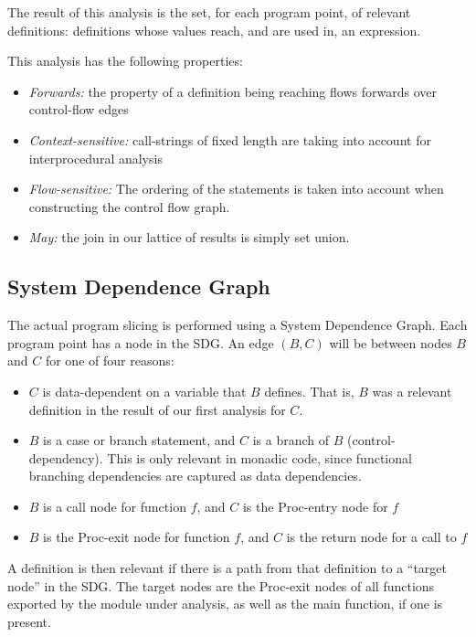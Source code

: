 \documentclass{article}
\begin{document}
The result of this analysis is the set, for each program point, of relevant definitions: definitions whose values reach, and are used in, an expression.

This analysis has the following properties:

\begin{itemize}
\item
 \textit{Forwards:} the property of a definition being reaching flows forwards over control-flow edges 
\item
 \textit{Context-sensitive:} call-strings of fixed length are taking into account for interprocedural analysis 
\item
 \textit{Flow-sensitive:} The ordering of the  statements is taken into account when constructing the control flow graph.
\item
 \textit{May:} the join in our lattice of results is simply set union.

\end{itemize}

\subsection{System Dependence Graph}

The actual program slicing is performed using a System Dependence Graph. Each program point has a node in the SDG. An edge $(B,C)$ will be between nodes $B$ and $C$ for one of four reasons:
\begin{itemize}
\item $C$ is data-dependent on a variable that $B$ defines. That is, $B$ was a relevant definition in the result of our first analysis for $C$. 
\item $B$ is a case or branch statement, and $C$ is a branch of $B$ (control-dependency). This is only relevant in monadic code, since functional branching dependencies are captured as data dependencies.
\item $B$ is a call node for function $f$, and $C$ is the Proc-entry node for $f$ 
\item $B$ is the Proc-exit node for function $f$, and $C$ is the return node for a call to $f$
\end{itemize} 

A definition is then relevant if there is a path from that definition to a ``target node'' in the SDG. The target nodes are the Proc-exit nodes of all functions exported by the module under analysis, as well as the main function, if one is present.
\end{document}
